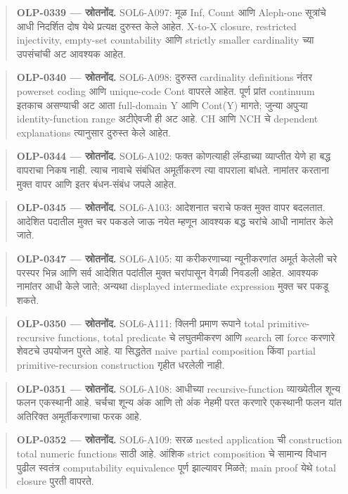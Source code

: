 \begin{quote}\small\textbf{OLP-0339 — स्रोतनोंद.} SOL6-A097: मूळ Inf, Count आणि Aleph-one सूत्रांचे आधी निदर्शित दोष येथे प्रत्यक्ष दुरुस्त केले आहेत. X-to-X closure, restricted injectivity, empty-set countability आणि strictly smaller cardinality च्या उपसंचांची अट आवश्यक आहेत.\end{quote}
\begin{quote}\small\textbf{OLP-0340 — स्रोतनोंद.} SOL6-A098: दुरुस्त cardinality definitions नंतर powerset coding आणि unique-code Cont वापरले आहेत. पूर्ण प्रांत continuum इतकाच असण्याची अट आता full-domain Y आणि Cont(Y) मागते; जुन्या अपुऱ्या identity-function range अटीऐवजी ही अट आहे. CH आणि NCH चे dependent explanations त्यानुसार दुरुस्त केले आहेत.\end{quote}
\begin{quote}\small\textbf{OLP-0344 — स्रोतनोंद.} SOL6-A102: फक्त कोणत्याही लॅम्डाच्या व्याप्तीत येणे हा बद्ध वापराचा निकष नाही. त्याच नावाचे संबंधित अमूर्तीकरण त्या वापराला बांधते. नामांतर करताना मुक्त वापर आणि इतर बंधन-संबंध जपले आहेत.\end{quote}
\begin{quote}\small\textbf{OLP-0345 — स्रोतनोंद.} SOL6-A103: आदेशनात चराचे फक्त मुक्त वापर बदलतात. आदेशित पदातील मुक्त चर पकडले जाऊ नयेत म्हणून आवश्यक बद्ध चरांचे आधी नामांतर केले जाते.\end{quote}
\begin{quote}\small\textbf{OLP-0347 — स्रोतनोंद.} SOL6-A105: या करीकरणाच्या न्यूनीकरणांत अमूर्त केलेली चरे परस्पर भिन्न आणि सर्व आदेशित पदांतील मुक्त चरांपासून वेगळी निवडली आहेत. आवश्यक नामांतर आधी केले जाते; अन्यथा displayed intermediate expression मुक्त चर पकडू शकते.\end{quote}
\begin{quote}\small\textbf{OLP-0350 — स्रोतनोंद.} SOL6-A111: क्लिनी प्रमाण रूपाने total primitive-recursive functions, total predicate चे लघुतमीकरण आणि search ला force करणारे शेवटचे उपयोजन पुरते आहे. या सिद्धतेत naive partial composition किंवा partial primitive-recursion construction गृहीत धरलेली नाही.\end{quote}
\begin{quote}\small\textbf{OLP-0351 — स्रोतनोंद.} SOL6-A108: आधीच्या recursive-function व्याख्येतील शून्य फलन एकस्थानी आहे. चर्चचा शून्य अंक आणि तो अंक नेहमी परत करणारे एकस्थानी फलन यांत अतिरिक्त अमूर्तीकरणाचा फरक आहे.\end{quote}
\begin{quote}\small\textbf{OLP-0352 — स्रोतनोंद.} SOL6-A109: सरळ nested application ची construction total numeric functions साठी आहे. आंशिक strict composition चे सामान्य विधान पुढील स्वतंत्र computability equivalence पूर्ण झाल्यावर मिळते; main proof येथे total closure पुरती वापरते.\end{quote}
